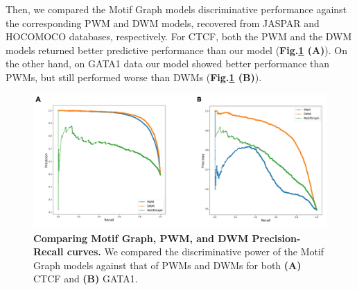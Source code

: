 \documentclass[a4paper, titlepage, 8pt, openright]{book}
\begin{document}
Then, we compared the Motif Graph models discriminative performance against the corresponding PWM and DWM models, recovered from JASPAR \citep{sandelin2004jaspar} and HOCOMOCO \citep{kulakovskiy2016hocomoco} databases, respectively. For CTCF, both the PWM and the DWM models returned better predictive performance than our model (\textbf{Fig.\ref{fig:dp_mg_pwm_dwm} (A)}). On the other hand, on GATA1 data our model showed better performance than PWMs, but still performed worse than DWMs (\textbf{Fig.\ref{fig:dp_mg_pwm_dwm} (B)}).
\begin{figure}
	\centering
	\includegraphics[width=\textwidth]{figures/dp_mg_pwm_dwm.jpg}
	\caption[Comparing Motif Graph, PWM, and DWM Precision-Recall curves.]{\textbf{Comparing Motif Graph, PWM, and DWM Precision-Recall curves.} We compared the discriminative power of the Motif Graph models against that of PWMs and DWMs for both \textbf{(A)} CTCF and \textbf{(B)} GATA1.}
	\label{fig:dp_mg_pwm_dwm}
\end{figure} 




\end{document}
